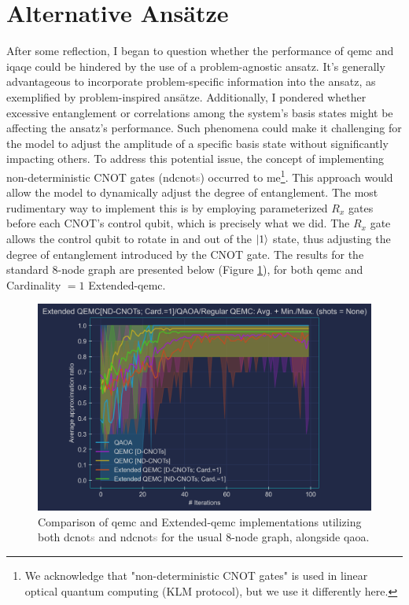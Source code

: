 \section{Alternative Ansätze}
\label{section:Alternative_ansätze}

After some reflection, I began to question whether the performance of \acrshort{qemc} and \acrshort{iqaqe} could be hindered by the use of a problem-agnostic ansatz. It's generally advantageous to incorporate problem-specific information into the ansatz, as exemplified by problem-inspired ansätze. Additionally, I pondered whether excessive entanglement or correlations among the system's basis states might be affecting the ansatz's performance. Such phenomena could make it challenging for the model to adjust the amplitude of a specific basis state without significantly impacting others. To address this potential issue, the concept of implementing non-deterministic CNOT gates (\acrshort{ndcnot}\textcolor{gray}{s}) occurred to me\footnote{We acknowledge that "non-deterministic CNOT gates" is used in linear optical quantum computing (KLM protocol), but we use it differently here.}. This approach would allow the model to dynamically adjust the degree of entanglement. The most rudimentary way to implement this is by employing parameterized $R_x$ gates before each CNOT's control qubit, which is precisely what we did. The $R_x$ gate allows the control qubit to rotate in and out of the $\ket{1}$ state, thus adjusting the degree of entanglement introduced by the CNOT gate. The results for the standard $8$-node graph are presented below (Figure \ref{fig:ND-CNOTs}), for both \acrshort{qemc} and Cardinality $= 1$ Extended-\acrshort{qemc}.
\begin{figure}[h]
  \centering
  \includegraphics[width=1.0\textwidth]{Figures/Chapter_5/Extended-QEMC/8-node[ND-CNOTs; Card.=1](n_layers=2, step_size=0.5).png}
  \caption{Comparison of \acrshort{qemc} and Extended-\acrshort{qemc} implementations utilizing both \acrshort{dcnot}\textcolor{gray}{s} and \acrshort{ndcnot}\textcolor{gray}{s} for the usual $8$-node graph, alongside \acrshort{qaoa}.}
  \label{fig:ND-CNOTs}
\end{figure}

